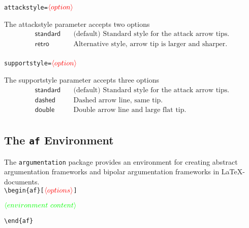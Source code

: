 \documentclass{article}
\newcommand{\argumentation}{\texttt{argumentation}\xspace}
\newcommand{\opt}[2][red]{\ensuremath{\textcolor{#1}{\langle #2\rangle}}}
\begin{document}
\noindent\texttt{attackstyle=}\opt{option}
    
    The \textsf{attackstyle} parameter accepts two options
    \begin{align*}
        \mathsf{standard} &\quad \text{(default) Standard style for the attack arrow tips.}\\
        \mathsf{retro} &\quad \text{Alternative style, arrow tip is larger and sharper.}\\
    \end{align*}

\noindent\texttt{supportstyle=}\opt{option}
    
    The \textsf{supportstyle} parameter accepts three options
    \begin{align*}
        \mathsf{standard} &\quad \text{(default) Standard style for the attack arrow tips.}\\
        \mathsf{dashed} &\quad \text{Dashed arrow line, same tip.}\\
        \mathsf{double} &\quad \text{Double arrow line and large flat tip.}\\
    \end{align*}
    

\subsection{The \texttt{af} Environment}
The \argumentation package provides an environment for creating abstract argumentation frameworks and bipolar argumentation frameworks in \LaTeX-documents.\\

\noindent
\verb|\begin{af}[|\opt{options}\verb|]|

\opt[green]{environment~content}

\noindent
\verb|\end{af}|
\end{document}
